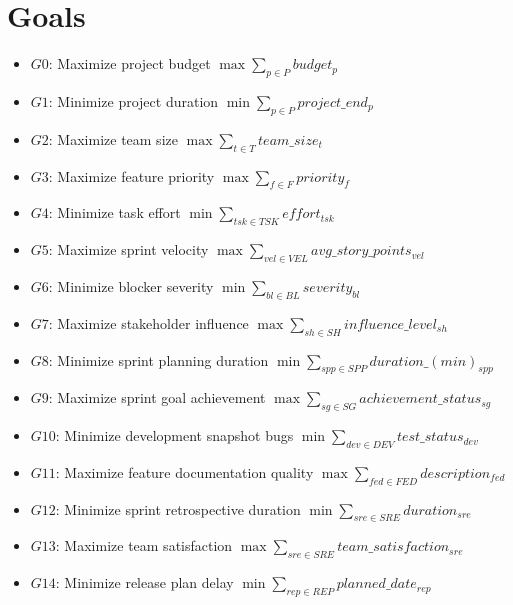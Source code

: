 \documentclass{article}
\begin{document}
\section{Goals}
\begin{itemize}
    \item $G0$: Maximize project budget $\max \sum_{p \in P} budget_p$
    \item $G1$: Minimize project duration $\min \sum_{p \in P} project\_end_p$
    \item $G2$: Maximize team size $\max \sum_{t \in T} team\_size_t$
    \item $G3$: Maximize feature priority $\max \sum_{f \in F} priority_f$
    \item $G4$: Minimize task effort $\min \sum_{tsk \in TSK} effort_{tsk}$
    \item $G5$: Maximize sprint velocity $\max \sum_{vel \in VEL} avg\_story\_points_{vel}$
    \item $G6$: Minimize blocker severity $\min \sum_{bl \in BL} severity_{bl}$
    \item $G7$: Maximize stakeholder influence $\max \sum_{sh \in SH} influence\_level_{sh}$
    \item $G8$: Minimize sprint planning duration $\min \sum_{spp \in SPP} duration\_(min)_{spp}$
    \item $G9$: Maximize sprint goal achievement $\max \sum_{sg \in SG} achievement\_status_{sg}$
    \item $G10$: Minimize development snapshot bugs $\min \sum_{dev \in DEV} test\_status_{dev}$
    \item $G11$: Maximize feature documentation quality $\max \sum_{fed \in FED} description_{fed}$
    \item $G12$: Minimize sprint retrospective duration $\min \sum_{sre \in SRE} duration_{sre}$
    \item $G13$: Maximize team satisfaction $\max \sum_{sre \in SRE} team\_satisfaction_{sre}$
    \item $G14$: Minimize release plan delay $\min \sum_{rep \in REP} planned\_date_{rep}$
\end{itemize}
\end{document}
